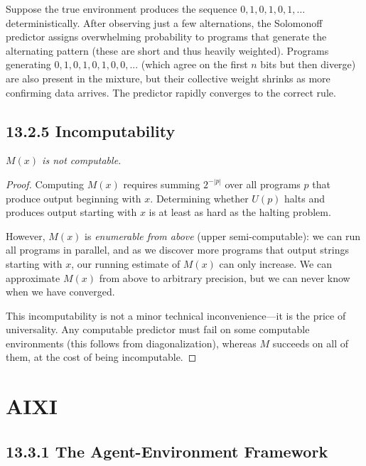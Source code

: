 \begin{example}
Suppose the true environment produces the sequence $0, 1, 0, 1, 0, 1, \ldots$ deterministically. After observing just a few alternations, the Solomonoff predictor assigns overwhelming probability to programs that generate the alternating pattern (these are short and thus heavily weighted). Programs generating $0,1,0,1,0,1,0,0,...$ (which agree on the first $n$ bits but then diverge) are also present in the mixture, but their collective weight shrinks as more confirming data arrives. The predictor rapidly converges to the correct rule.
\end{example}

\subsection{13.2.5 Incomputability}

\begin{proposition}
\textit{$M(x)$ is not computable.}


\end{proposition}

\begin{proof}
Computing $M(x)$ requires summing $2^{-|p|}$ over all programs $p$ that produce output beginning with $x$. Determining whether $U(p)$ halts and produces output starting with $x$ is at least as hard as the halting problem. 

However, $M(x)$ is \textit{enumerable from above} (upper semi-computable): we can run all programs in parallel, and as we discover more programs that output strings starting with $x$, our running estimate of $M(x)$ can only increase. We can approximate $M(x)$ from above to arbitrary precision, but we can never know when we have converged.

This incomputability is not a minor technical inconvenience---it is the price of universality. Any computable predictor must fail on some computable environments (this follows from diagonalization), whereas $M$ succeeds on all of them, at the cost of being incomputable.



\end{proof}

\section{AIXI}

\subsection{13.3.1 The Agent-Environment Framework}

